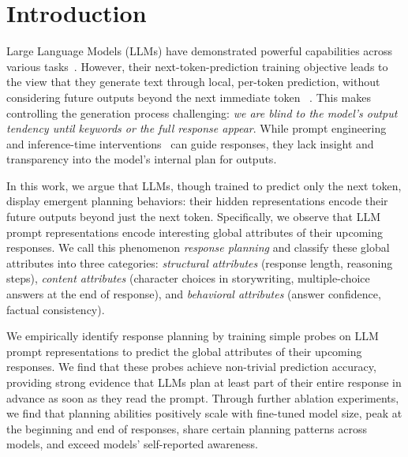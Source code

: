 \section{Introduction}\label{sec:introduction}
Large Language Models (LLMs) have demonstrated powerful capabilities across various tasks~\cite{brown2020language, achiam2023gpt, touvron2023llama, claude2024}. However, their next-token-prediction training objective leads to the view that they generate text through local, per-token prediction, without considering future outputs beyond the next immediate token~\cite{bachmann2024pitfalls,cornille2024learning}
. This makes controlling the generation process challenging: \textit{we are blind to the model's output tendency until keywords or the full response appear}. While prompt engineering and inference-time interventions~\cite{liu2023pre, li2024inference, zhou2024weak} can guide responses, they lack insight and transparency into the model's internal plan for outputs.

In this work, we argue that LLMs, though trained to predict only the next token, display emergent planning behaviors: their hidden representations encode their future outputs beyond just the next token. %
Specifically, we observe that LLM prompt representations encode interesting global attributes of their upcoming responses. We call this phenomenon \textit{response planning} and classify these global attributes into three categories: \textit{structural attributes} (response length, reasoning steps), \textit{content attributes} (character choices in storywriting, multiple-choice answers at the end of response), and \textit{behavioral attributes} (answer confidence, factual consistency).

We empirically identify response planning by training simple probes on LLM prompt representations to predict the global attributes of their upcoming responses. We find that these probes achieve non-trivial prediction accuracy, providing strong evidence that LLMs plan at least part of their entire response in advance as soon as they read the prompt.
Through further ablation experiments, we find that planning abilities positively scale with fine-tuned model size, peak at the beginning and end of responses, share certain planning patterns across models, and exceed models' self-reported awareness.


